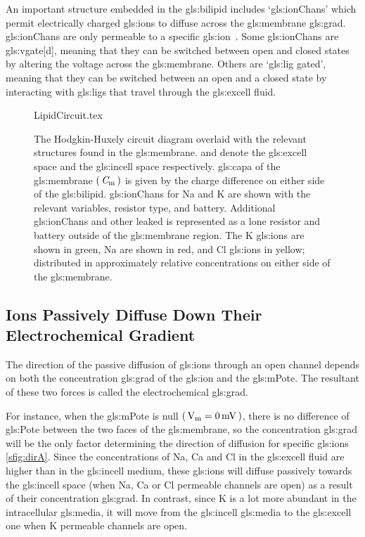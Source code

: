 \documentclass[class={myRUCProject}, crop=false]{standalone}
\begin{document}
An important structure embedded in the \gls{gls:bilipid} includes `\glspl{gls:ionChan}' which permit electrically charged \glspl{gls:ion} to diffuse across the \gls{gls:membrane} \gls{gls:grad}. \Glspl{gls:ionChan} are only permeable to a specific \gls{gls:ion}~\cite{}. Some \glspl{gls:ionChan} are \gls{gls:vgate}[d], meaning that they can be switched between open and closed states by altering the voltage across the \gls{gls:membrane}. 
Others are `\gls{gls:lig} gated', meaning that they can be switched between an open and a closed state by interacting with \glspl{gls:lig} that travel through the \gls{gls:excell} fluid. 

\vspace{1em}

\begin{figure}[H]
    \centering
    {LipidCircuit.tex}
    \caption{The Hodgkin-Huxely circuit diagram overlaid with the relevant structures found in the \gls{gls:membrane}.  and  denote the \gls{gls:excell} space and the \gls{gls:incell} space respectively. \Gls{gls:capa} of the \gls{gls:membrane} \(\left(\,\mathit{C}_\mathrm{m}\,\right)\) is given by the charge difference on either side of the \gls{gls:bilipid}. \Glspl{gls:ionChan} for \gls{Na} and \gls{K} are shown with the relevant variables, resistor type, and battery. Additional \glspl{gls:ionChan} and other leaked is represented as a lone resistor and battery outside of the \gls{gls:membrane} region. The \gls{K} \glspl{gls:ion} are shown in green, \gls{Na} are shown in red, and \gls{Cl} \glspl{gls:ion} in yellow; distributed in approximately relative concentrations on either side of the \gls{gls:membrane}. }\label{fig:MembraneCircut}
\end{figure}


\subsection{Ions Passively Diffuse Down Their Electrochemical Gradient}
The direction of the passive diffusion of \glspl{gls:ion} through an open channel depends on both the concentration \gls{gls:grad} of the \gls{gls:ion} and the \gls{gls:mPote}. The resultant of these two forces is called the electrochemical \gls{gls:grad}.

For instance, when the \gls{gls:mPote} is null \(\br{\unit{\V\membrane}=\qty{0}{\mV}}\), there is no difference of \gls{gls:Pote} between the two faces of the \gls{gls:membrane}, so the concentration \gls{gls:grad} will be the only factor determining the direction of diffusion for specific \glspl{gls:ion} \cref{sfig:dirA}. Since the concentrations of \gls{Na}, \gls{Ca} and \gls{Cl} in the \gls{gls:excell} fluid are higher than in the \gls{gls:incell} medium, these \glspl{gls:ion} will diffuse passively towards the \gls{gls:incell} space (when \gls{Na}, \gls{Ca} or \gls{Cl} permeable channels are open) as a result of their concentration \gls{gls:grad}. In contrast, since \gls{K} is a lot more abundant in the intracellular \gls{gls:media}, it will move from the \gls{gls:incell} \gls{gls:media} to the \gls{gls:excell} one when \gls{K} permeable channels are open. 
\end{document}
